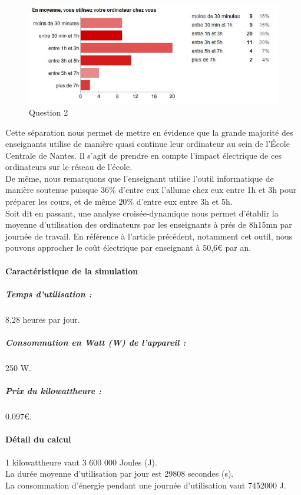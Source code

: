 \documentclass[a4paper,11pt,french]{report}
\begin{document}
\begin{figure}[h!]
\includegraphics[width=\textwidth]{i7.JPG}
\caption{Question 2}
\label{i7}
\end{figure}

Cette séparation nous permet de mettre en évidence que la grande majorité des enseignants utilise de manière quasi continue leur ordinateur au sein de l'École Centrale de Nantes. Il s'agit de prendre en compte l'impact électrique de ces ordinateurs sur le réseau de l'école.\\

De même, nous remarquons que l'enseignant utilise l'outil informatique de manière soutenue puisque $36\%$ d'entre eux l'allume chez eux entre 1h et 3h pour préparer les cours, et de même $20\%$ d'entre eux entre 3h et 5h.\\

Soit dit en passant, une analyse croisée-dynamique nous permet d'établir la moyenne d'utilisation des ordinateurs par les enseignants à prés de 8h15mn par journée de travail. En référence à l'article précédent, notamment cet outil, nous pouvons approcher le coût électrique par enseignant à 50,6\euro{} par an.\\

\paragraph{Caractéristique de la simulation}

\subparagraph{Temps d'utilisation :} 8,28 heures par jour.
\subparagraph{Consommation en Watt (W) de l'appareil :}250 W.
\subparagraph{Prix du kilowattheure :} 0.097\euro{}. 

\paragraph{Détail du calcul}

1 kilowattheure vaut 3 600 000 Joules (J).\\
La durée moyenne d'utilisation par jour est 29808 secondes (s).\\
La consommation d'énergie pendant une journée d'utilisation vaut 7452000 J.\\
\end{document}
